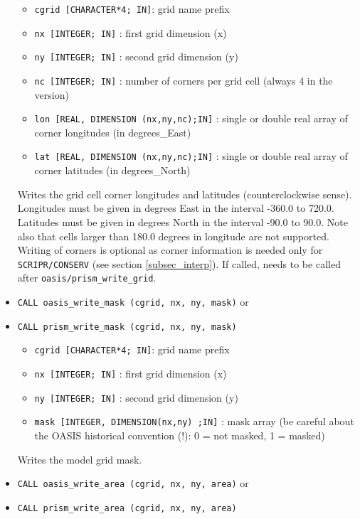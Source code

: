 \begin{itemize}
  \begin{itemize}
  \item {\tt cgrid [CHARACTER*4; IN]}: grid name prefix
  \item {\tt nx [INTEGER; IN]} : first grid dimension (x)
  \item {\tt ny [INTEGER; IN]} : second grid dimension (y)
  \item {\tt nc [INTEGER; IN]} : number of corners per grid cell
    (always 4 in the version)
  \item {\tt lon [REAL, DIMENSION (nx,ny,nc);IN]} : single or double real array of corner
    longitudes (in degrees\_East)
  \item {\tt lat [REAL, DIMENSION (nx,ny,nc);IN]} : single or double real array of corner
    latitudes (in degrees\_North)
  \end{itemize}

  Writes the grid cell corner longitudes and latitudes
  (counterclockwise sense). Longitudes must be given in degrees East
  in the interval -360.0 to 720.0. Latitudes must be given in degrees
  North in the interval -90.0 to 90.0. Note also that cells larger
  than 180.0 degrees in longitude are not supported. Writing of
  corners is optional as corner information is needed only for {\tt
    SCRIPR/CONSERV} (see section \ref{subsec_interp}). If called,
  needs to be called after {\tt oasis/prism\_write\_grid}.

  \vspace{0.2cm}
\item {\tt CALL oasis\_write\_mask (cgrid, nx, ny, mask)} or
\item {\tt CALL prism\_write\_mask (cgrid, nx, ny, mask)}

  \begin{itemize}
  \item {\tt cgrid [CHARACTER*4; IN]}: grid name prefix
  \item {\tt nx [INTEGER; IN]} : first grid dimension (x)
  \item {\tt ny [INTEGER; IN]} : second grid dimension (y)
  \item {\tt mask [INTEGER, DIMENSION(nx,ny) ;IN]} : mask array (be
    careful about the OASIS historical convention (!): 0 = not masked,
    1 = masked)
  \end{itemize}
  Writes the model grid mask.

  \vspace{0.2cm}
\item {\tt CALL oasis\_write\_area (cgrid, nx, ny, area)} or
\item {\tt CALL prism\_write\_area (cgrid, nx, ny, area)}


\end{itemize}

